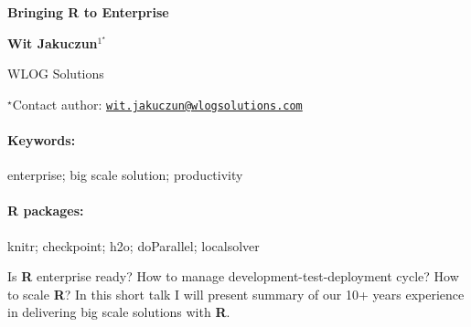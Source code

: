 \documentclass[11pt, a4paper]{article}
\renewcommand{\title}[1]{\begin{center}{\bf \LARGE #1}\end{center}}
\newcommand{\keywords}{\paragraph{Keywords:}}
\newcommand{\packages}{\paragraph{R packages:}}
\begin{document}
\pagestyle{empty}

\title{Bringing R to Enterprise}

\begin{center}
  {\bf Wit Jakuczun$^{1^\star}$}
\end{center}

\vskip 0.3cm

\begin{affiliations}
\begin{enumerate}
\begin{minipage}{0.915\textwidth}
\centering
\item WLOG Solutions \\[-2pt]
\end{minipage}
\end{enumerate}
$^\star$Contact author: \href{mailto:wit.jakuczun@wlogsolutions.com}{\nolinkurl{wit.jakuczun@wlogsolutions.com}}\\
\end{affiliations}

\vskip 0.5cm

\begin{minipage}{0.915\textwidth}
\keywords enterprise; big scale solution; productivity
\packages knitr; checkpoint; h2o; doParallel; localsolver
\end{minipage}

\vskip 0.8cm

Is \textbf{R} enterprise ready? How to manage
development-test-deployment cycle? How to scale \textbf{R}? In this
short talk I will present summary of our 10+ years experience in
delivering big scale solutions with \textbf{R}.
\end{document}
